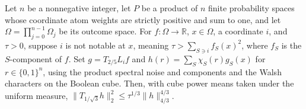 \begin{theorem}
\leanok
{}
Let $n$ be a nonnegative integer, let $P$ be a product of $n$ finite probability spaces
whose coordinate atom weights are strictly positive and sum to one, and let
$\Omega=\prod_{j=0}^{n-1}\Omega_j$ be its outcome space. For $f\colon\Omega\to\mathbb
R$, $x\in\Omega$, a coordinate $i$, and $\tau>0$, suppose $i$ is not notable at $x$,
meaning $\tau>\sum_{S\ni i}f_S(x)^2$, where $f_S$ is the $S$-component of $f$. Set
$g=T_{2/5}L_i f$ and $h(r)=\sum_S\chi_S(r)g_S(x)$ for $r\in\{0,1\}^n$, using the product
spectral noise and components and the Walsh characters on the Boolean cube. Then, with
cube power means taken under the uniform measure,
$\|T_{1/\sqrt3}h\|_2^2\le\tau^{1/3}\|h\|_{4/3}^{4/3}$.
\end{theorem}
